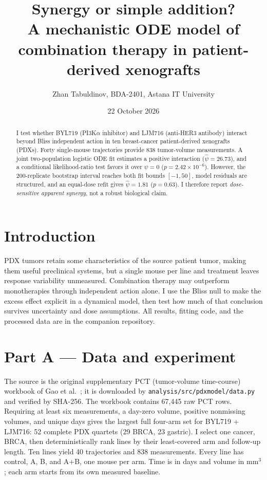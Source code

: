 \documentclass[10pt,a4paper]{article}
\title{\vspace{-1.2cm}\bfseries Synergy or simple addition?\\[3pt]\large A mechanistic ODE model of combination therapy in patient-derived xenografts}
\author{Zhan Tabuldinov, BDA-2401, Astana IT University}
\date{22 October 2026}
\begin{document}
\maketitle
\vspace{-1em}
\begin{abstract}
I test whether BYL719 (PI3K$\alpha$ inhibitor) and LJM716 (anti-HER3 antibody) interact beyond Bliss independent action in ten breast-cancer patient-derived xenografts (PDXs). Forty single-mouse trajectories provide 838 tumor-volume measurements. A joint two-population logistic ODE fit estimates a positive interaction ($\hat\psi=26.73$), and a conditional likelihood-ratio test favors it over $\psi=0$ ($p=2.42\times10^{-6}$). However, the 200-replicate bootstrap interval reaches both fit bounds $[-1,50]$, model residuals are structured, and an equal-dose refit gives $\hat\psi=1.81$ ($p=0.63$). I therefore report \emph{dose-sensitive apparent synergy}, not a robust biological claim.
\end{abstract}

\section*{Introduction}
PDX tumors retain some characteristics of the source patient tumor, making them useful preclinical systems, but a single mouse per line and treatment leaves response variability unmeasured. Combination therapy may outperform monotherapies through independent action alone. I use the Bliss null to make the excess effect explicit in a dynamical model, then test how much of that conclusion survives uncertainty and dose assumptions. All results, fitting code, and the processed data are in the companion repository.

\section*{Part A — Data and experiment}
The source is the original supplementary PCT (tumor-volume time-course) workbook of Gao et al.\ \cite{gao}; it is downloaded by \texttt{analysis/src/pdxmodel/data.py} and verified by SHA-256. The workbook contains 67,445 raw PCT rows. Requiring at least six measurements, a day-zero volume, positive nonmissing volumes, and unique days gives the largest full four-arm set for BYL719 + LJM716: 52 complete PDX quartets (29 BRCA, 23 gastric). I select one cancer, BRCA, then deterministically rank lines by their least-covered arm and follow-up length. Ten lines yield 40 trajectories and 838 measurements. Every line has control, A, B, and A+B, one mouse per arm. Time is in days and volume in mm$^3$; each arm starts from its own measured baseline.
\end{document}
